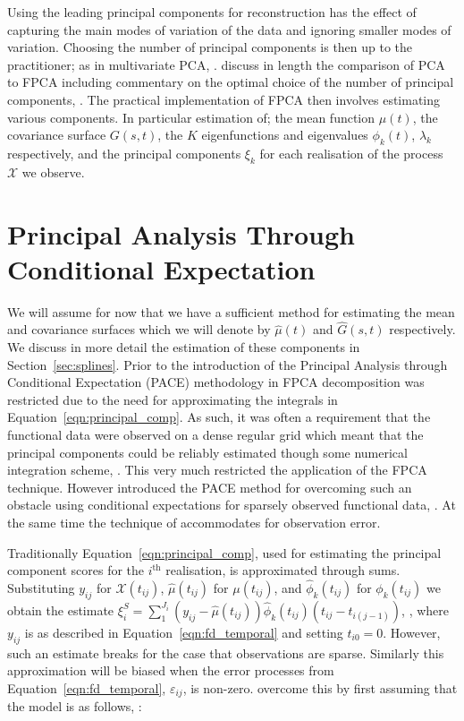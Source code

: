 Using the leading principal components for reconstruction has the effect of capturing the main modes of variation of the data and ignoring smaller modes of variation.
Choosing the number of principal components is then up to the practitioner; as in multivariate PCA, \citep{wold_principal_1987}.
 \citeauthor{ramsay_functional_2010} discuss in length the comparison of PCA to FPCA including commentary on the optimal choice of the number of principal components, \cite[Chapter~8]{ramsay_functional_2010}.
 The practical implementation of FPCA then involves estimating various components.
 In particular estimation of;  the mean function $\mu(t)$, the covariance surface $G\left(s,t \right)$, the $K$ eigenfunctions and eigenvalues $\phi_k(t)$, $\lambda_k$ respectively, and the principal components $\xi_k$ for each realisation of the process $\mathcal{X}$ we observe.

\section{Principal Analysis Through Conditional Expectation \label{sec:pace}}
We will assume for now that we have a sufficient method for estimating the mean  and covariance surfaces which we will denote by $\hat{\mu}(t)$ and $\hat{G}\left(s, t \right)$ respectively.
We discuss in more detail the estimation of these components in Section~\ref{sec:splines}.
Prior to the introduction of the Principal Analysis through Conditional Expectation (PACE) methodology in \citep{yao_functional_2005} FPCA decomposition was restricted due to the need for approximating the integrals in Equation~\eqref{eqn:principal_comp}.
As such, it was often a requirement that the functional data were observed on a dense regular grid which meant that the principal components could be reliably estimated though some numerical integration scheme, \citep[Chapter~8]{ramsay_functional_2010}.
This very much restricted the application of the FPCA technique.
However \citeauthor{yao_functional_2005} introduced the PACE method for overcoming such an obstacle using conditional expectations for sparsely observed functional data, \citep{yao_functional_2005}.
At the same time the technique of \citep{yao_functional_2005} accommodates for observation error. 

Traditionally Equation~\eqref{eqn:principal_comp}, used for estimating the principal component scores for the $i^\text{th}$ realisation, is approximated through sums.
Substituting $y_{ij}$ for $\mathcal{X}(t_{ij})$, $\hat{\mu}(t_{ij})$ for $\mu(t_{ij})$, and $\hat{\phi}_k(t_{ij})$ for  $\phi_k(t_{ij})$ we obtain the estimate $\xi_i^{S} = \sum_1^{J_i}\left(y_{ij} - \hat{\mu}(t_{ij})\right)\hat{\phi}_k(t_{ij})\left(t_{ij} - t_{i(j-1)}\right)$, \citep{yao_functional_2005}, where $y_{ij}$ is as described in Equation~\eqref{eqn:fd_temporal} and setting $t_{i0}=0$.
However, such an estimate breaks for the case that observations are sparse.
Similarly this approximation will be biased when the error processes from Equation~\eqref{eqn:fd_temporal}, $\varepsilon_{ij}$, is non-zero.
\citeauthor{yao_functional_2005} overcome this by first assuming that the model is as follows, \citep{yao_functional_2005}:

